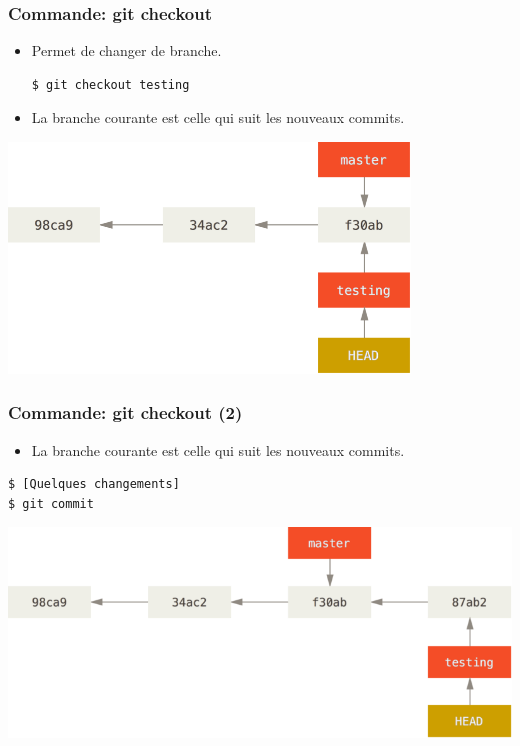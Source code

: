 \documentclass{beamer}
\begin{document}
\begin{frame}[fragile]
    \frametitle{Commande: git checkout}
    \begin{itemize}
        \item Permet de changer de branche.
\begin{lstlisting}
$ git checkout testing
\end{lstlisting}
        \item La branche courante est celle qui suit les nouveaux commits.
    \end{itemize}
    \begin{center}
        \includegraphics[width=0.8\textwidth]{img/head-to-testing.png}
    \end{center}
\end{frame}

\begin{frame}[fragile]
    \frametitle{Commande: git checkout (2)}
    \begin{itemize}
        \item La branche courante est celle qui suit les nouveaux commits.
    \end{itemize}
\begin{lstlisting}
$ [Quelques changements]
$ git commit
\end{lstlisting}

    \begin{center}
        \includegraphics[width=\textwidth]{img/advance-testing.png}
    \end{center}
\end{frame}
\end{document}
